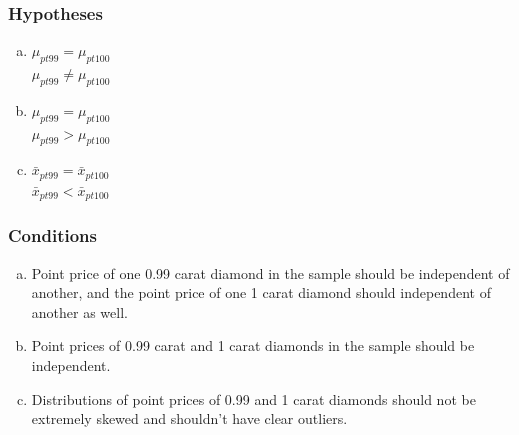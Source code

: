 \documentclass[slidestop,compress,mathserif]{beamer}
\begin{document}

\begin{frame}
\frametitle{Hypotheses}


\begin{enumerate}[(a)]

\item  {} $\mu_{pt99} = \mu_{pt100}$ \\
 $\mu_{pt99} \ne \mu_{pt100}$

\item  {} $\mu_{pt99} = \mu_{pt100}$ \\
 $\mu_{pt99} > \mu_{pt100}$


\item  {} $\bar{x}_{pt99} = \bar{x}_{pt100}$ \\
 $\bar{x}_{pt99} < \bar{x}_{pt100}$

\end{enumerate}

\end{frame}


\begin{frame}
\frametitle{Conditions}


\begin{enumerate}[(a)]

\item Point price of one 0.99 carat diamond in the sample should be independent of another, and the point price of one 1 carat diamond should independent of another as well.

\item Point prices of 0.99 carat and 1 carat diamonds in the sample should be independent.

\item Distributions of point prices of 0.99 and 1 carat diamonds should not be extremely skewed and shouldn't have clear outliers.


\end{enumerate}

\end{frame}
\end{document}
